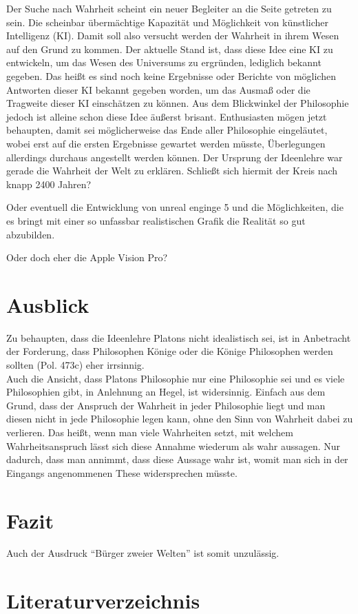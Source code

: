 \documentclass[12pt]{article}
\begin{document}
Der Suche nach Wahrheit scheint ein neuer Begleiter an die Seite getreten zu sein. Die scheinbar übermächtige Kapazität und Möglichkeit von künstlicher Intelligenz (KI). Damit soll also versucht werden der Wahrheit in ihrem Wesen auf den Grund zu kommen. Der aktuelle Stand ist, dass diese Idee eine KI zu entwickeln, um das Wesen des Universums zu ergründen, lediglich bekannt gegeben. Das heißt es sind noch keine Ergebnisse oder Berichte von möglichen Antworten dieser KI bekannt gegeben worden, um das Ausmaß oder die Tragweite dieser KI einschätzen zu können. Aus dem Blickwinkel der Philosophie jedoch ist alleine schon diese Idee äußerst brisant. Enthusiasten mögen jetzt behaupten, damit sei möglicherweise das Ende aller Philosophie eingeläutet, wobei erst auf die ersten Ergebnisse gewartet werden müsste, Überlegungen allerdings durchaus angestellt werden können.
Der Ursprung der Ideenlehre war gerade die Wahrheit der Welt zu erklären. Schließt sich hiermit der Kreis nach knapp 2400 Jahren?

Oder eventuell die Entwicklung von unreal enginge 5 und die Möglichkeiten, die es bringt mit einer so unfassbar realistischen Grafik die Realität so gut abzubilden.

Oder doch eher die Apple Vision Pro?
\section{Ausblick}
Zu behaupten, dass die Ideenlehre Platons nicht idealistisch sei, ist in Anbetracht der Forderung, dass Philosophen Könige oder die Könige Philosophen werden sollten (Pol. 473c) eher irrsinnig.\\
Auch die Ansicht, dass Platons Philosophie nur eine Philosophie sei und es viele Philosophien gibt, in Anlehnung an Hegel, ist widersinnig. Einfach aus dem Grund, dass der Anspruch der Wahrheit in jeder Philosophie liegt und man diesen nicht in jede Philosophie legen kann, ohne den Sinn von Wahrheit dabei zu verlieren. Das heißt, wenn man viele Wahrheiten setzt, mit welchem Wahrheitsanspruch lässt sich diese Annahme wiederum als wahr aussagen. Nur dadurch, dass man annimmt, dass diese Aussage wahr ist, womit man sich in der Eingangs angenommenen These widersprechen müsste. 
\section{Fazit}
Auch der Ausdruck \enquote{Bürger zweier Welten} ist somit unzulässig.
\newpage
\nocite{politeia}
\nocite{Parmenides}
\section*{Literaturverzeichnis}
\printbibliography[keyword={Primärliteratur}, title={Primärliteratur}]
\printbibliography[keyword={Sekundärliteratur}, title={Sekundärliteratur}]
\printbibliography[keyword={Internetquelle}, title={Internetquellen}]
\end{document}
